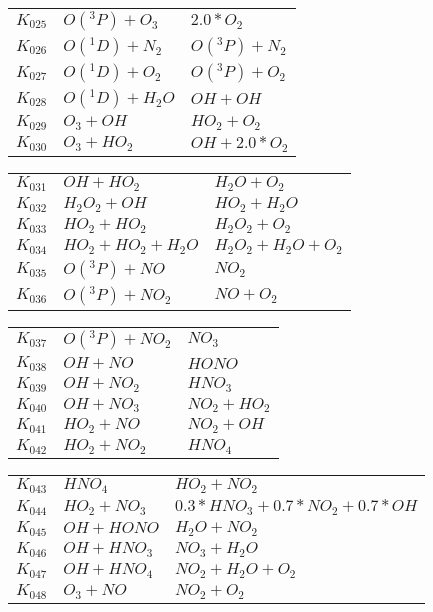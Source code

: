 {\begin{tabular}{l@{\,:\,}p{0.2\chfwidth}@{$\quad\longrightarrow\quad$}p{0.6\chfwidth}}
$K_{025}$ & $O({}^3P)+O_{3}$ & $2.0*O_{2}$ \\
$K_{026}$ & $O({}^1D)+N_{2}$ & $O({}^3P)+N_{2}$ \\
$K_{027}$ & $O({}^1D)+O_{2}$ & $O({}^3P)+O_{2}$ \\
$K_{028}$ & $O({}^1D)+H_{2}O$ & $OH+OH$ \\
$K_{029}$ & $O_{3}+OH$ & $HO_{2}+O_{2}$ \\
$K_{030}$ & $O_{3}+HO_{2}$ & $OH+2.0*O_{2}$ \\
\end{tabular}

\begin{tabular}{l@{\,:\,}p{0.2\chfwidth}@{$\quad\longrightarrow\quad$}p{0.6\chfwidth}}
$K_{031}$ & $OH+HO_{2}$ & $H_{2}O+O_{2}$ \\
$K_{032}$ & $H_{2}O_{2}+OH$ & $HO_{2}+H_{2}O$ \\
$K_{033}$ & $HO_{2}+HO_{2}$ & $H_{2}O_{2}+O_{2}$ \\
$K_{034}$ & $HO_{2}+HO_{2}+H_{2}O$ & $H_{2}O_{2}+H_{2}O+O_{2}$ \\
$K_{035}$ & $O({}^3P)+NO$ & $NO_{2}$ \\
$K_{036}$ & $O({}^3P)+NO_{2}$ & $NO+O_{2}$ \\
\end{tabular}

\begin{tabular}{l@{\,:\,}p{0.2\chfwidth}@{$\quad\longrightarrow\quad$}p{0.6\chfwidth}}
$K_{037}$ & $O({}^3P)+NO_{2}$ & $NO_{3}$ \\
$K_{038}$ & $OH+NO$ & $HONO$ \\
$K_{039}$ & $OH+NO_{2}$ & $HNO_{3}$ \\
$K_{040}$ & $OH+NO_{3}$ & $NO_{2}+HO_{2}$ \\
$K_{041}$ & $HO_{2}+NO$ & $NO_{2}+OH$ \\
$K_{042}$ & $HO_{2}+NO_{2}$ & $HNO_{4}$ \\
\end{tabular}

\begin{tabular}{l@{\,:\,}p{0.2\chfwidth}@{$\quad\longrightarrow\quad$}p{0.6\chfwidth}}
$K_{043}$ & $HNO_{4}$ & $HO_{2}+NO_{2}$ \\
$K_{044}$ & $HO_{2}+NO_{3}$ & $0.3*HNO_{3}+0.7*NO_{2}+0.7*OH$ \\
$K_{045}$ & $OH+HONO$ & $H_{2}O+NO_{2}$ \\
$K_{046}$ & $OH+HNO_{3}$ & $NO_{3}+H_{2}O$ \\
$K_{047}$ & $OH+HNO_{4}$ & $NO_{2}+H_{2}O+O_{2}$ \\
$K_{048}$ & $O_{3}+NO$ & $NO_{2}+O_{2}$ \\
\end{tabular}

}
